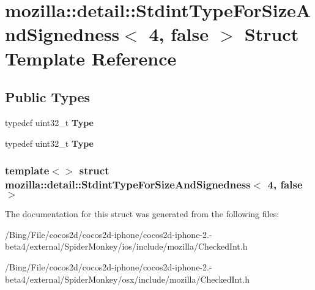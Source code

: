 \hypertarget{structmozilla_1_1detail_1_1_stdint_type_for_size_and_signedness_3_014_00_01false_01_4}{\section{mozilla\-:\-:detail\-:\-:Stdint\-Type\-For\-Size\-And\-Signedness$<$ 4, false $>$ Struct Template Reference}
\label{structmozilla_1_1detail_1_1_stdint_type_for_size_and_signedness_3_014_00_01false_01_4}
}
\subsection*{Public Types}
\begin{DoxyCompactItemize}
\item 
\hypertarget{structmozilla_1_1detail_1_1_stdint_type_for_size_and_signedness_3_014_00_01false_01_4_a3fa0b4b4680cf5c94fc2dc37e4877989}{typedef uint32\-\_\-t {\bfseries Type}}\label{structmozilla_1_1detail_1_1_stdint_type_for_size_and_signedness_3_014_00_01false_01_4_a3fa0b4b4680cf5c94fc2dc37e4877989}

\item 
\hypertarget{structmozilla_1_1detail_1_1_stdint_type_for_size_and_signedness_3_014_00_01false_01_4_a3fa0b4b4680cf5c94fc2dc37e4877989}{typedef uint32\-\_\-t {\bfseries Type}}\label{structmozilla_1_1detail_1_1_stdint_type_for_size_and_signedness_3_014_00_01false_01_4_a3fa0b4b4680cf5c94fc2dc37e4877989}

\end{DoxyCompactItemize}
\subsubsection*{template$<$$>$ struct mozilla\-::detail\-::\-Stdint\-Type\-For\-Size\-And\-Signedness$<$ 4, false $>$}



The documentation for this struct was generated from the following files\-:\begin{DoxyCompactItemize}
\item 
/\-Bing/\-File/cocos2d/cocos2d-\/iphone/cocos2d-\/iphone-\/2.-\/beta4/external/\-Spider\-Monkey/ios/include/mozilla/Checked\-Int.\-h\item 
/\-Bing/\-File/cocos2d/cocos2d-\/iphone/cocos2d-\/iphone-\/2.-\/beta4/external/\-Spider\-Monkey/osx/include/mozilla/Checked\-Int.\-h\end{DoxyCompactItemize}
